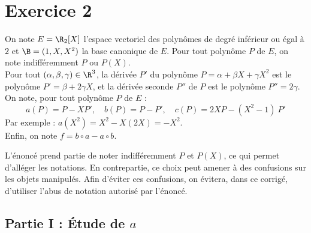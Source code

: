 \newpage


\section*{Exercice 2}

\noindent
On note $E = \R_2[X]$ l'espace vectoriel des polynômes de degré
inférieur ou égal à $2$ et $\B = (1,X,X^2)$ la base canonique de $E$.
Pour tout polynôme $P$ de $E$, on note indifféremment $P$ ou $P(X)$.\\
Pour tout $(\alpha,\beta,\gamma)\in\R^3$, la dérivée $P'$ du polynôme
$P=\alpha+\beta X+\gamma X^2$ est le polynôme $P' = \beta+2\gamma X$,
et la dérivée seconde $P''$ de $P$ est le polynôme $P'' = 2\gamma$.\\
On note, pour tout polynôme $P$ de $E$ :
\[
a(P) = P-XP', \quad b(P) = P-P', \quad c(P) = 2XP-(X^2-1) \ P'
\]
Par exemple : $a(X^2) = X^2-X(2X) = -X^2$.\\
Enfin, on note $f = b\circ a - a \circ b$.

\begin{remarkL}{.95}%
  L'énoncé prend partie de noter indifféremment $P$ et $P(X)$, ce qui
  permet d'alléger les notations. En contrepartie, ce choix peut
  amener à des confusions sur les objets manipulés. Afin d'éviter ces
  confusions, on évitera, dans ce corrigé, d'utiliser l'abus de
  notation autorisé par l'énoncé.
\end{remarkL}


\subsection*{Partie I : Étude de $a$}

